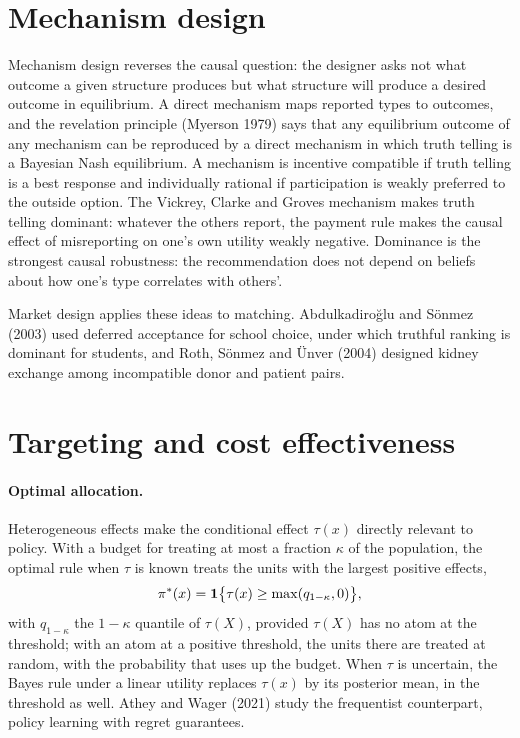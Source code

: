 \section{Mechanism design}\label{cdt:sec:mechanism}

Mechanism design reverses the causal question: the designer asks not what outcome a given structure produces but what structure will produce a desired outcome in equilibrium. A direct mechanism maps reported types to outcomes, and the revelation principle (Myerson 1979) says that any equilibrium outcome of any mechanism can be reproduced by a direct mechanism in which truth telling is a Bayesian Nash equilibrium. A mechanism is incentive compatible if truth telling is a best response and individually rational if participation is weakly preferred to the outside option. The Vickrey, Clarke and Groves mechanism makes truth telling dominant: whatever the others report, the payment rule makes the causal effect of misreporting on one's own utility weakly negative. Dominance is the strongest causal robustness: the recommendation does not depend on beliefs about how one's type correlates with others'.

Market design applies these ideas to matching. Abdulkadiro\u{g}lu and S\"onmez (2003) used deferred acceptance for school choice, under which truthful ranking is dominant for students, and Roth, S\"onmez and \"Unver (2004) designed kidney exchange among incompatible donor and patient pairs. 

\section{Targeting and cost effectiveness}\label{cdt:sec:targeting}

\paragraph{Optimal allocation.} Heterogeneous effects make the conditional effect $\tau(x)$ directly relevant to policy. With a budget for treating at most a fraction $\kappa$ of the population, the optimal rule when $\tau$ is known treats the units with the largest positive effects,
\[
\pi^\ast(x) = \mathbf{1}\bigl\{\tau(x) \ge \max(q_{1-\kappa}, 0)\bigr\},
\]
with $q_{1-\kappa}$ the $1-\kappa$ quantile of $\tau(X)$, provided $\tau(X)$ has no atom at the threshold; with an atom at a positive threshold, the units there are treated at random, with the probability that uses up the budget. When $\tau$ is uncertain, the Bayes rule under a linear utility replaces $\tau(x)$ by its posterior mean, in the threshold as well.  Athey and Wager (2021) study the frequentist counterpart, policy learning with regret guarantees.

